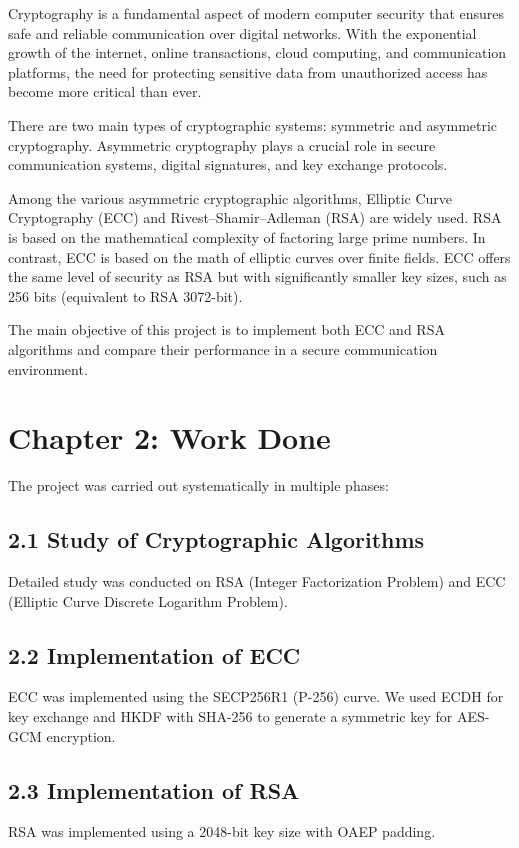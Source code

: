 \documentclass[12pt, a4paper]{report}
\begin{document}
Cryptography is a fundamental aspect of modern computer security that ensures safe and reliable communication over digital networks. With the exponential growth of the internet, online transactions, cloud computing, and communication platforms, the need for protecting sensitive data from unauthorized access has become more critical than ever.

There are two main types of cryptographic systems: symmetric and asymmetric cryptography. Asymmetric cryptography plays a crucial role in secure communication systems, digital signatures, and key exchange protocols.

Among the various asymmetric cryptographic algorithms, Elliptic Curve Cryptography (ECC) and Rivest–Shamir–Adleman (RSA) are widely used. RSA is based on the mathematical complexity of factoring large prime numbers. In contrast, ECC is based on the math of elliptic curves over finite fields. ECC offers the same level of security as RSA but with significantly smaller key sizes, such as 256 bits (equivalent to RSA 3072-bit).

The main objective of this project is to implement both ECC and RSA algorithms and compare their performance in a secure communication environment.

\chapter*{Chapter 2: Work Done}

The project was carried out systematically in multiple phases:

\section{2.1 Study of Cryptographic Algorithms}
Detailed study was conducted on RSA (Integer Factorization Problem) and ECC (Elliptic Curve Discrete Logarithm Problem).

\section{2.2 Implementation of ECC}
ECC was implemented using the SECP256R1 (P-256) curve. We used ECDH for key exchange and HKDF with SHA-256 to generate a symmetric key for AES-GCM encryption.

\section{2.3 Implementation of RSA}
RSA was implemented using a 2048-bit key size with OAEP padding.
\end{document}

